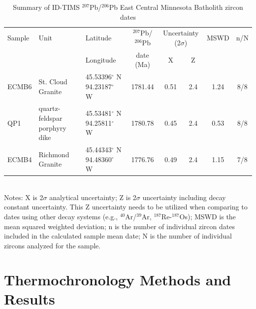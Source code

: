 \documentclass[draft]{agujournal2019}
\begin{document}
\begin{table}[h!]
\footnotesize
\caption{Summary of ID-TIMS $^{207}$Pb/$^{206}$Pb East Central Minnesota Batholith zircon dates}
\begin{tabular}{p{1 cm}p{2.4 cm}p{1.8 cm}ccccc}
\hline
Sample & Unit & Latitude & $^{207}$Pb/$^{206}$Pb & \multicolumn{2}{c}{Uncertainty (2$\sigma$)} & MSWD & n/N \\
 &  & Longitude & date (Ma) & X & Z & & \\
\hline
ECMB6 & St. Cloud Granite & 45.53396$^{\circ}$ N 94.23187$^{\circ}$ W & 1781.44 & 0.51 & 2.4 & 1.24 & 8/8 \\
QP1 & quartz-feldspar porphyry dike & 45.53481$^{\circ}$ N 94.25811$^{\circ}$ W & 1780.78 & 0.45 & 2.4 & 0.53 & 8/8 \\
ECMB4 & Richmond Granite & 45.44343$^{\circ}$ N 94.48360$^{\circ}$ W & 1776.76 & 0.49 & 2.4 & 1.15 & 7/8 \\
\hline
\end{tabular}\\
Notes: X is 2$\sigma$ analytical uncertainty; Z is 2$\sigma$ uncertainty including decay constant uncertainty. This Z uncertainty needs to be utilized when comparing to dates using other decay systems (e.g., $^{40}$Ar/$^{39}$Ar, $^{187}$Re-$^{187}$Os); MSWD is the mean squared weighted deviation; n is the number of individual zircon dates included in the calculated sample mean date; N is the number of individual zircons analyzed for the sample.
\label{tab:geochron}
\end{table}

\section*{Thermochronology Methods and Results}
\end{document}
